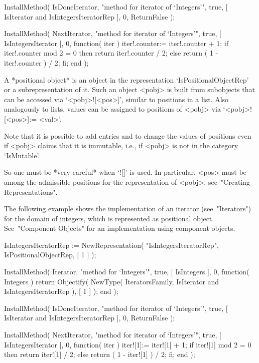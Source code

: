     InstallMethod( IsDoneIterator,
        "method for iterator of `Integers'",
        true,
        [ IsIterator and IsIntegersIteratorRep ], 0,
        ReturnFalse );

    InstallMethod( NextIterator,
        "method for iterator of `Integers'",
        true,
        [ IsIntegersIterator ], 0,
        function( iter )
        iter!.counter:= iter!.counter + 1;
        if iter!.counter mod 2 = 0 then
          return iter!.counter / 2;
        else
          return ( 1 - iter!.counter ) / 2;
        fi;
        end );
\endtt


A *positional object* is an object in the representation
`IsPositionalObjectRep' or a subrepresentation of it.
Such an object <pobj> is built from subobjects that can be accessed via
`<pobj>![<pos>]', similar to positions in a list.
Also analogously to lists, values can be assigned to positions of
<pobj> via `<pobj>![<pos>]:= <val>'.

Note that it is possible to add entries and to change the values of
positions even if <pobj> claims that it is immutable, i.e., if <pobj>
is not in the category `IsMutable'.

So one must be *very careful* when `![]' is used.
In particular, <pos> must be among the admissible positions for
the representation of <pobj>, see~"Creating Representations".

The following example shows the implementation of an iterator
(see~"Iterators") for the domain of integers,
which is represented as positional object.
See~"Component Objects" for an implementation using component objects.

\begintt
    IsIntegersIteratorRep := NewRepresentation( "IsIntegersIteratorRep",
        IsPositionalObjectRep, [ 1 ] );

    InstallMethod( Iterator,
        "method for `Integers'",
        true,
        [ IsIntegers ], 0,
        function( Integers )
        return Objectify( NewType( IteratorsFamily,
                                       IsIterator
                                   and IsIntegersIteratorRep ),
                          [ 1 ] );
        end );

    InstallMethod( IsDoneIterator,
        "method for iterator of `Integers'",
        true,
        [ IsIterator and IsIntegersIteratorRep ], 0,
        ReturnFalse );

    InstallMethod( NextIterator,
        "method for iterator of `Integers'",
        true,
        [ IsIntegersIterator ], 0,
        function( iter )
        iter![1]:= iter![1] + 1;
        if iter![1] mod 2 = 0 then
          return iter![1] / 2;
        else
          return ( 1 - iter![1] ) / 2;
        fi;
        end );
\endtt

